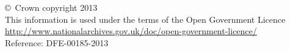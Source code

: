 \documentclass[a4paper,12pt]{article}
\begin{document}
\vfill

\footnotesize
\noindent \copyright\ Crown copyright 2013\\
This information is used under the terms of the Open Government Licence\\
\url{http://www.nationalarchives.gov.uk/doc/open-government-licence/}\\
{\tiny Reference: DFE-00185-2013}
\end{document}
